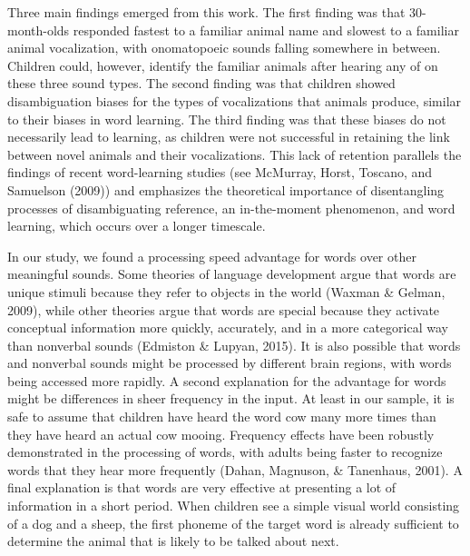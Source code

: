 \documentclass[english,floatsintext,man]{apa6}
\theoremstyle{definition}
\theoremstyle{definition}
\theoremstyle{definition}
\theoremstyle{remark}
\begin{document}
Three main findings emerged from this work. The first finding was that
30-month-olds responded fastest to a familiar animal name and slowest to
a familiar animal vocalization, with onomatopoeic sounds falling
somewhere in between. Children could, however, identify the familiar
animals after hearing any of on these three sound types. The second
finding was that children showed disambiguation biases for the types of
vocalizations that animals produce, similar to their biases in word
learning. The third finding was that these biases do not necessarily
lead to learning, as children were not successful in retaining the link
between novel animals and their vocalizations. This lack of retention
parallels the findings of recent word-learning studies (see McMurray,
Horst, Toscano, and Samuelson (2009)) and emphasizes the theoretical
importance of disentangling processes of disambiguating reference, an
in-the-moment phenomenon, and word learning, which occurs over a longer
timescale.

In our study, we found a processing speed advantage for words over other
meaningful sounds. Some theories of language development argue that
words are unique stimuli because they refer to objects in the world
(Waxman \& Gelman, 2009), while other theories argue that words are
special because they activate conceptual information more quickly,
accurately, and in a more categorical way than nonverbal sounds
(Edmiston \& Lupyan, 2015). It is also possible that words and nonverbal
sounds might be processed by different brain regions, with words being
accessed more rapidly. A second explanation for the advantage for words
might be differences in sheer frequency in the input. At least in our
sample, it is safe to assume that children have heard the word cow many
more times than they have heard an actual cow mooing. Frequency effects
have been robustly demonstrated in the processing of words, with adults
being faster to recognize words that they hear more frequently (Dahan,
Magnuson, \& Tanenhaus, 2001). A final explanation is that words are
very effective at presenting a lot of information in a short period.
When children see a simple visual world consisting of a dog and a sheep,
the first phoneme of the target word is already sufficient to determine
the animal that is likely to be talked about next.
\end{document}

